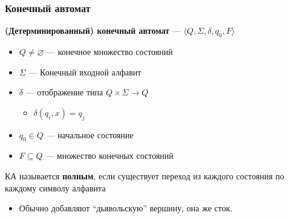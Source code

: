 \documentclass{beamer}
\begin{document}
\begin{frame}[fragile]
  \transwipe[direction=90]
  \frametitle{Конечный автомат}
  \textbf{(Детерминированный) конечный автомат} --- $\langle Q, \Sigma, \delta, q_0, F \rangle$
  \begin{itemize}
    \item $Q \neq \varnothing$ --- конечное множество состояний
    \item $\Sigma$ --- Конечный входной алфавит
    \item $\delta$ --- отображение типа $Q \times \Sigma \rightarrow Q$
    \begin{itemize}
      \item $\delta(q_i, x) = q_j$
    \end{itemize}
    \item $q_0 \in Q$ --- начальное состояние
    \item $F \subseteq Q$ --- множество конечных состояний
  \end{itemize}

  КА называется \textbf{полным}, если существует переход из каждого состояния по каждому символу алфавита
\begin{itemize}
    \item Обычно добавляют ``дьявольскую'' вершину, она же сток. 
\end{itemize}
\end{frame}
\end{document}
